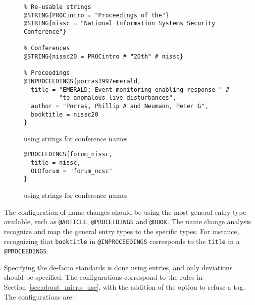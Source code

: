 \begin{figure}
  \centering
\begin{small}
\begin{verbatim}
% Re-usable strings
@STRING{PROCintro = "Proceedings of the"}
@STRING{nissc = "National Information Systems Security Conference"}

% Conferences
@STRING{nissc20 = PROCintro # "20th" # nissc}

% Proceedings
@INPROCEEDINGS{porras1997emerald,
  title = "EMERALD: Event monitoring enabling response " #
          "to anomalous live disturbances",
  author = "Porras, Phillip A and Neumann, Peter G",
  booktitle = nissc20
}
\end{verbatim}
\end{small}
  \caption{ using strings for conference names}
  \label{fig:analyzing_configuration_name_change_bib_file_strings}
\end{figure}

\begin{figure}
  \centering
\begin{verbatim}
@PROCEEDINGS{forum_nissc,
  title = nissc,
  OLDforum = "forum_ncsc"
}
\end{verbatim}
  \caption{ using strings for conference names}
  \label{fig:analyzing_configuration_name_change_config_file_strings}
\end{figure}


The configuration of name changes should be using the most general
entry type available, such as \texttt{@ARTICLE}, \texttt{@PROCEEDINGS}
and \texttt{@BOOK}.  The name change analysis recognize and map the
general entry types to the specific types.  For instance, recognizing
that \texttt{booktitle} in \texttt{@INPROCEEDINGS} corresponds to the
\texttt{title} in a \texttt{@PROCEEDINGS}.

Specifying the de-facto standards is done using {\bibtex} entries, and
only deviations should be specified.  The configurations correspond to
the rules in Section~\ref{sec:about_micro_use}, with the addition of
the option to refuse a tag.  The configurations are:

